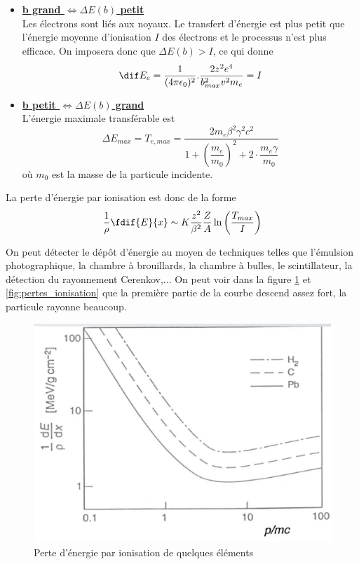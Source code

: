 \begin{itemize}[label=$\rightarrow$]
    \item \underline{\textbf{b grand $\Leftrightarrow\Delta E(b)$ petit}}\\[0,2cm]
    Les électrons sont liés aux noyaux. Le transfert d'énergie est plus petit que l'énergie moyenne d'ionisation $I$ des électrons et le processus n'est plus efficace. On imposera donc que $\Delta E(b) > I$, ce qui donne
    \[
        \dif E_e=\dfrac{1}{(4\pi \epsilon_0)^2}.\dfrac{2z^2e^4}{b_{max}^2v^2m_e}=I
    \]
    \item \underline{\textbf{b petit $\Longleftrightarrow\Delta E(b)$ grand}}\\[0,2cm]
    L'énergie maximale transférable est
    \[
        \Delta E_{max}=T_{e,max}=\dfrac{2m_e\beta^2\gamma^2c^2}{1+\left(\dfrac{m_e}{m_0}\right)^2+2\cdot\dfrac{m_e\gamma}{m_0}}
    \]
    où $m_0$ est la masse de la particule incidente.
\end{itemize}
La perte d'énergie par ionisation est donc de la forme
\[
    \dfrac{1}{\rho}\fdif{E}{x} \sim K\dfrac{z^2}{\beta^2}\dfrac{Z}{A}  \ln{\left(\dfrac{T_{max}}{I}\right)}
\]

On peut détecter le dépôt d'énergie au moyen de techniques telles que l'émulsion photographique, la chambre à brouillards, la chambre à bulles, le scintillateur, la détection du rayonnement Cerenkov,...
On peut voir dans la figure \ref{fig:perte_energie} et \ref{fig:pertes_ionisation} que la première partie de la courbe descend assez fort, la particule rayonne beaucoup.

\begin{figure}[ht]
    \centering
    \includegraphics[scale=0.60]{Images1/perteenergie.PNG}
    \caption{Perte d'énergie par ionisation de quelques éléments}
    \label{fig:perte_energie}
\end{figure}

